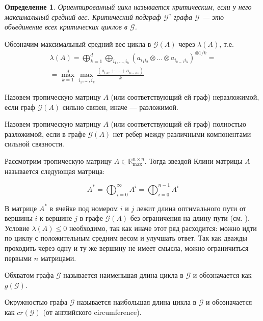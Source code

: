 \documentclass[12pt]{article}
\newtheorem{definition}[theorem]{Определение}
\begin{document}
\begin{definition}
Ориентированный цикл называется критическим, если у него максимальный средний вес. Критический подграф $\mathcal{G}^c$ графа $\mathcal{G}$ --- это объединение всех критических циклов в $\mathcal{G}$.
\end{definition}

Обозначим максимальный средний вес цикла в $\mathcal{G}(A)$ через $\lambda(A)$, т.е.
\begin{equation*}
    \begin{split}
        \lambda(A) = \bigoplus_{k = 1}^d \bigoplus_{i_1, \dots, i_k} (a_{{i_1}{i_2}}\otimes \dots \otimes a_{{i_{k - 1}}{i_k}})^{\otimes{1/k}} =\\
        =\max_{k = 1}^d \max_{i_1, \dots, i_k} \frac{(a_{{i_1}{i_2}} + \dots + a_{{i_{k - 1}}{i_k}})}{k}
    \end{split}
\end{equation*}

Назовем тропическую матрицу $A$ (или соответствующий ей граф) неразложимой, если граф $\mathcal{G}(A)$ сильно связен, иначе --- разложимой.

Назовем тропическую матрицу $A$ (или соответствующий ей граф) полностью разложимой, если в графе $\mathcal{G}(A)$ нет ребер между различными компонентами сильной связности.

Рассмотрим тропическую матрицу $A \in \mathbb{R}_{\max}^{n \times n}$. Тогда звездой Клини матрицы $A$ называется следующая матрица:

\begin{equation*}
    A^* = \bigoplus_{i = 0}^{\infty} A^i =  \bigoplus_{i = 0}^{n - 1} A^i
\end{equation*}

В матрице $A^*$ в ячейке под номером $i$ и $j$ лежит длина оптимального пути от вершины $i$ к вершине $j$ в графе $\mathcal{G}(A)$ без ограничения на длину пути (см. \cite[ стр. 167]{15WeakCSRExpantion}). Условие $\lambda(A) \le 0$ необходимо, так как иначе этот ряд расходится: можно идти по циклу с положительным средним весом и улучшать ответ. Так как дважды проходить через одну и ту же вершину не имеет смысла, можно ограничиться первыми $n$ матрицами.

Обхватом графа $\mathcal{G}$ называется наименьшая длина цикла в $\mathcal{G}$ и обозначается как $g(\mathcal{G})$.

Окружностью графа $\mathcal{G}$ называется наибольшая длина цикла в $\mathcal{G}$ и обозначается как $cr(\mathcal{G})$ (от английского circumference).
\end{document}
